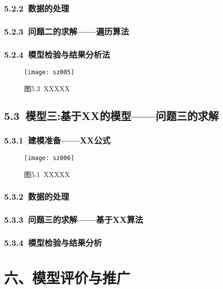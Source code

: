 \documentclass[12pt,a4paper]{article}
\begin{document}
\subsubsection*{5.2.2\ 数据的处理}


\subsubsection*{5.2.3\ 问题二的求解——遍历算法}


\subsubsection*{5.2.4\ 模型检验与结果分析法}
\begin{figure}[htbp] %
	\centering\texttt{[image: sz005]} %
	\caption*{图5.3\ XXXXX}
\end{figure}


\subsection*{5.3\ 模型三:基于XX的模型——问题三的求解}
\subsubsection*{5.3.1\ 建模准备——XX公式}
\begin{figure}[htbp] %
	\centering\texttt{[image: sz006]} %
	\caption*{图5.1\ XXXXX}
\end{figure}
\subsubsection*{5.3.2\ 数据的处理}
\subsubsection*{5.3.3\ 问题三的求解——基于XX算法}
\subsubsection*{5.3.4\ 模型检验与结果分析}

\section*{六、模型评价与推广}
\end{document}
